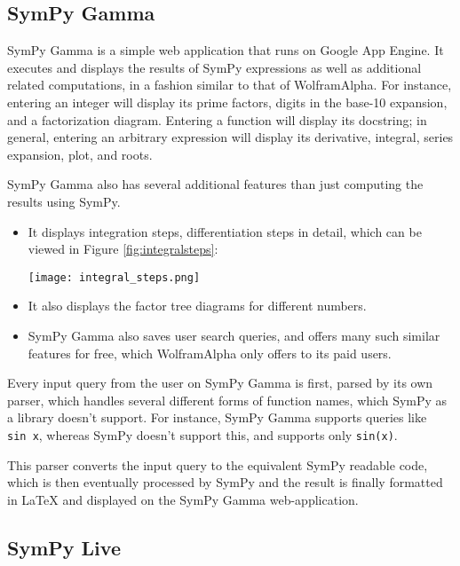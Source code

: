 \subsection{SymPy Gamma}\label{sympy-gamma}

SymPy Gamma is a simple web application that runs on Google App Engine. 
It executes and displays the results of SymPy expressions as well as
additional related computations, in a fashion similar to that of
Wolfram\textbar{}Alpha. For instance, entering an integer will display
its prime factors, digits in the base-10 expansion, and a factorization
diagram. Entering a function will display its docstring; in general,
entering an arbitrary expression will display its derivative, integral,
series expansion, plot, and roots.

SymPy Gamma also has several additional features than just computing the
results using SymPy.

\begin{itemize}
\item
  It displays integration steps, differentiation steps in detail, which
  can be viewed in Figure \ref{fig:integralsteps}:\par
\begin{minipage}{\textwidth}
    \centering
    \texttt{[image: integral\_steps.png]}
    \label{fig:integralsteps}
\end{minipage}
\item
  It also displays the factor tree diagrams for different numbers.
\item
  SymPy Gamma also saves user search queries, and offers many such 
  similar features for free, which Wolfram\textbar{}Alpha only offers 
  to its paid users.
\end{itemize}
Every input query from the user on SymPy Gamma is first, parsed by its
own parser, which handles several different forms of function names,
which SymPy as a library doesn't support. For instance, SymPy Gamma
supports queries like \texttt{sin\ x}, whereas SymPy doesn't support
this, and supports only \texttt{sin(x)}.

This parser converts the input query to the equivalent SymPy readable 
code, which is then eventually processed by SymPy and the result is 
finally formatted in LaTeX and displayed on the SymPy Gamma web-application.

\subsection{SymPy Live}\label{sympy-live}

